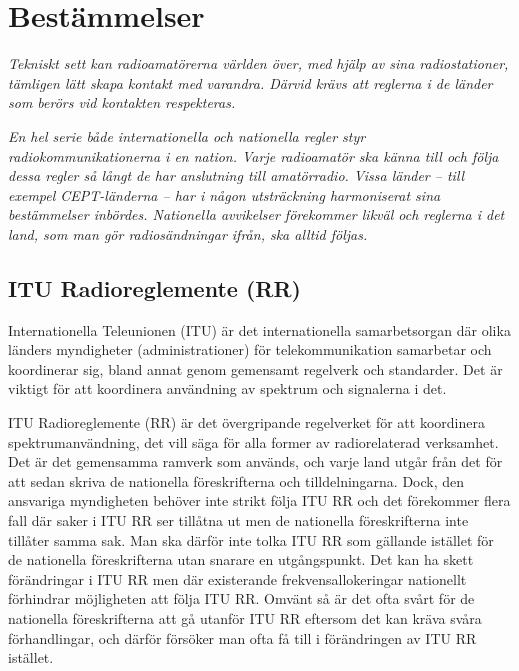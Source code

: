 \chapter{Bestämmelser}

\emph{Tekniskt sett kan radioamatörerna världen över, med hjälp av
  sina radiostationer, tämligen lätt skapa kontakt med varandra.
  Därvid krävs att reglerna i de länder som berörs vid kontakten respekteras.}

\emph{En hel serie både internationella och nationella regler styr
  radiokommunikationerna i en nation.
  Varje radioamatör ska känna till och följa dessa regler så långt de har
  anslutning till amatörradio.
  Vissa länder -- till exempel CEPT-länderna -- har i någon utsträckning harmoniserat
  sina bestämmelser inbördes.
  Nationella avvikelser förekommer likväl och reglerna i det land, som man gör
  radiosändningar ifrån, ska alltid följas.}

\section{ITU Radioreglemente (RR)}
\label{ITU radioreglemente}

Internationella Teleunionen (ITU) är det internationella samarbetsorgan där
olika länders myndigheter (administrationer) för telekommunikation samarbetar
och koordinerar sig, bland annat genom gemensamt regelverk och standarder.
Det är viktigt för att koordinera användning av spektrum och signalerna i det.

ITU Radioreglemente (RR) \cite{ITU-RR} är det övergripande regelverket för att
koordinera spektrumanvändning, det vill säga för alla former av
radiorelaterad verksamhet.
Det är det gemensamma ramverk som används, och varje land utgår från det för att
sedan skriva de nationella föreskrifterna och tilldelningarna.
Dock, den ansvariga myndigheten behöver inte strikt följa ITU RR och det
förekommer flera fall där saker i ITU RR ser tillåtna ut men de nationella
föreskrifterna inte tillåter samma sak.
Man ska därför inte tolka ITU RR som gällande istället för de nationella
föreskrifterna utan snarare en utgångspunkt.
Det kan ha skett förändringar i ITU RR men där existerande frekvensallokeringar
nationellt förhindrar möjligheten att följa ITU RR.
Omvänt så är det ofta svårt för de nationella föreskrifterna att gå utanför
ITU RR eftersom det kan kräva svåra förhandlingar, och därför försöker man ofta
få till i förändringen av ITU RR istället.


